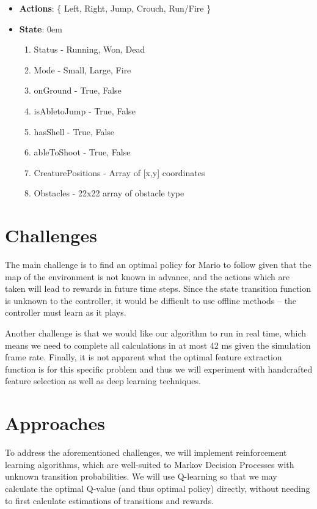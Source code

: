 \documentclass[12pt]{article}
\begin{document}
\begin{itemize}
\item[] \textbf{Actions}: \{ Left, Right, Jump, Crouch, Run/Fire \}
\item[] \textbf{State}:
\itemsep0em
\begin{enumerate}
\item[] Status - Running, Won, Dead
\item[] Mode - Small, Large, Fire
\item[] onGround - True, False
\item[] isAbletoJump - True, False
\item[] hasShell - True, False
\item[] ableToShoot - True, False
\item[] CreaturePositions - Array of [x,y] coordinates
\item[] Obstacles - 22x22 array of obstacle type
\end{enumerate}
\end{itemize}

\section{Challenges}

The main challenge is to find an optimal policy for Mario to follow given that the map of the environment is not known in advance, and the actions which are taken will lead to rewards in future time steps. Since the state transition function is unknown to the controller, it would be difficult to use offline methods -- the controller must learn as it plays. 

Another challenge is that we would like our algorithm to run in real time, which means we need to complete all calculations in at most 42 ms given the simulation frame rate. Finally, it is not apparent what the optimal feature extraction function is for this specific problem and thus we will experiment with handcrafted feature selection as well as deep learning techniques.

\section{Approaches}

To address the aforementioned challenges, we will implement reinforcement learning algorithms, which are well-suited to Markov Decision Processes with unknown transition probabilities. We will use Q-learning so that we may calculate the optimal Q-value (and thus optimal policy) directly, without needing to first calculate estimations of transitions and rewards. 
\end{document}
